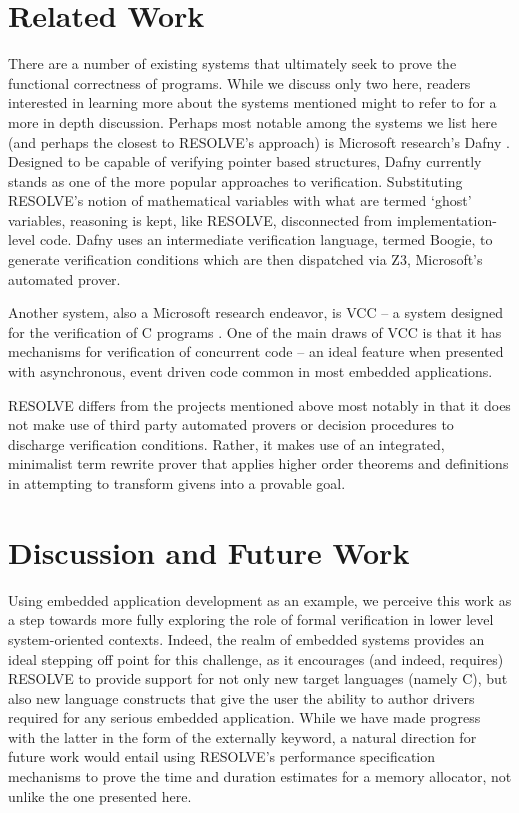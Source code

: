 \section{Related Work}

There are a number of existing systems that ultimately seek to prove the functional correctness of programs. While we discuss only two here, readers interested in learning more about the systems mentioned might to refer to \cite{klebanov:2011} for a more in depth discussion. Perhaps most notable among the systems we list here (and perhaps the closest to RESOLVE's approach) is Microsoft research's Dafny \cite{leino:2010}. Designed to be capable of verifying pointer based structures, Dafny currently stands as one of the more popular approaches to verification. Substituting RESOLVE's notion of mathematical variables with what are termed `ghost' variables, reasoning is kept, like RESOLVE, disconnected from implementation-level code. Dafny uses an intermediate verification language, termed Boogie, to generate verification conditions which are then dispatched via Z3, Microsoft's automated prover. 

Another system, also a Microsoft research endeavor, is VCC -- a system designed for the verification of C programs \cite{vcc:2009}. One of the main draws of VCC is that it has mechanisms for verification of concurrent code -- an ideal feature when presented with asynchronous, event driven code common in most embedded applications. 

RESOLVE differs from the projects mentioned above most notably in that it does not make use of third party automated provers or decision procedures to discharge verification conditions. Rather, it makes use of an integrated, minimalist term rewrite prover that applies higher order theorems and definitions in attempting to transform givens into a provable goal. 


\section{Discussion and Future Work}

Using embedded application development as an example, we perceive this work as a step towards more fully exploring the role of formal verification in lower level system-oriented contexts. Indeed, the realm of embedded systems provides an ideal stepping off point for this challenge, as it encourages (and indeed, requires) RESOLVE to provide support for not only new target languages (namely C), but also new language constructs that give the user the ability to author drivers required for any serious embedded application. While we have made progress with the latter in the form of the externally keyword, a natural direction for future work would entail using RESOLVE's performance specification mechanisms to prove the time and duration estimates for a memory allocator, not unlike the one presented here.

